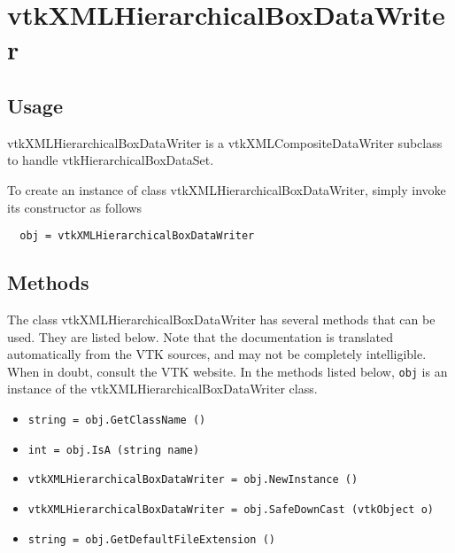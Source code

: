 \section{vtkXMLHierarchicalBoxDataWriter}

\subsection{Usage}

 vtkXMLHierarchicalBoxDataWriter is a vtkXMLCompositeDataWriter subclass to
 handle vtkHierarchicalBoxDataSet.

To create an instance of class vtkXMLHierarchicalBoxDataWriter, simply
invoke its constructor as follows
\begin{verbatim}
  obj = vtkXMLHierarchicalBoxDataWriter
\end{verbatim}
\subsection{Methods}

The class vtkXMLHierarchicalBoxDataWriter has several methods that can be used.
  They are listed below.
Note that the documentation is translated automatically from the VTK sources,
and may not be completely intelligible.  When in doubt, consult the VTK website.
In the methods listed below, \verb|obj| is an instance of the vtkXMLHierarchicalBoxDataWriter class.
\begin{itemize}
\item  \verb|string = obj.GetClassName ()|

\item  \verb|int = obj.IsA (string name)|

\item  \verb|vtkXMLHierarchicalBoxDataWriter = obj.NewInstance ()|

\item  \verb|vtkXMLHierarchicalBoxDataWriter = obj.SafeDownCast (vtkObject o)|

\item  \verb|string = obj.GetDefaultFileExtension ()|

\end{itemize}
